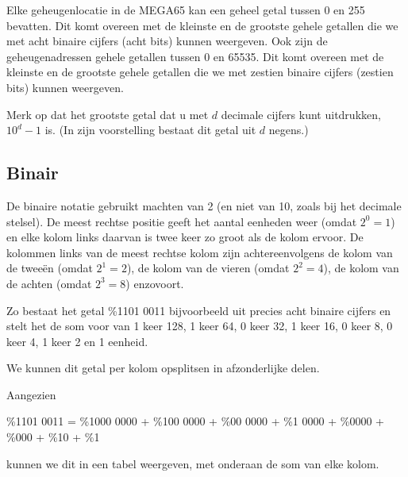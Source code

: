 Elke geheugenlocatie in de MEGA65 kan een geheel getal tussen 0 en 255 bevatten. Dit komt overeen met de kleinste en de grootste gehele getallen die we met acht binaire cijfers (acht bits) kunnen weergeven. Ook zijn de geheugenadressen gehele getallen tussen 0 en 65535. Dit komt overeen met de kleinste en de grootste gehele getallen die we met zestien binaire cijfers (zestien bits) kunnen weergeven.

Merk op dat het grootste getal dat u met $d$ decimale cijfers kunt uitdrukken, $10^{d} - 1$ is. (In zijn voorstelling bestaat dit getal uit $d$ negens.)

\subsection{Binair}De binaire notatie gebruikt machten van 2 (en niet van 10, zoals bij het decimale stelsel). De meest rechtse positie geeft het aantal eenheden weer (omdat $2^{0} = 1$) en elke kolom links daarvan is twee keer zo groot als de kolom ervoor. De kolommen links van de meest rechtse kolom zijn achtereenvolgens de kolom van de tweeën (omdat $2^{1} = 2$), de kolom van de vieren (omdat $2^{2} = 4$), de kolom van de achten (omdat $2^{3} = 8$) enzovoort.

Zo bestaat het getal \%1101 0011 bijvoorbeeld uit precies acht binaire cijfers en stelt het de som voor van 1 keer 128, 1 keer 64, 0 keer 32, 1 keer 16, 0 keer 8, 0 keer 4, 1 keer 2 en 1 eenheid.

We kunnen dit getal per kolom opsplitsen in afzonderlijke delen.

Aangezien
\begin{center}
	\small{\%1101 0011} = \small{\%1000 0000} + \small{\%100 0000} + \small{\%00 0000} + \small{\%1 0000} + \small{\%0000} + \small{\%000} + \small{\%10} + \small{\%1}
\end{center}
kunnen we dit in een tabel weergeven, met onderaan de som van elke kolom.

